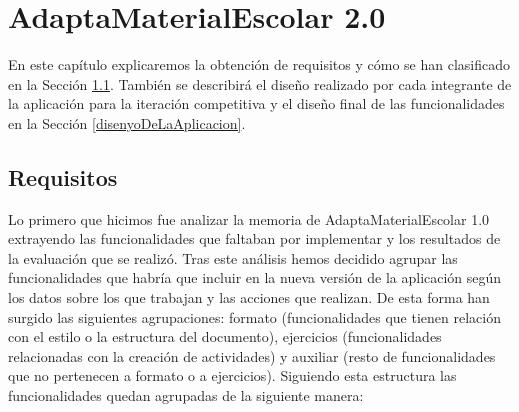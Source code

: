 \chapter{AdaptaMaterialEscolar 2.0}
\label{cap:AdaptaMaterialEscolar2.0}
En este capítulo explicaremos la obtención de requisitos y cómo se han clasificado en la Sección \ref{cap:requisitos}. También se describirá el diseño realizado por cada integrante de la aplicación para la iteración competitiva y el diseño final de las funcionalidades en la Sección \ref{disenyoDeLaAplicacion}.

\section{Requisitos}
\label{cap:requisitos}

Lo primero que hicimos fue analizar la memoria de AdaptaMaterialEscolar 1.0 \citep*{AdaptaMaterialEscolar1.0} extrayendo las funcionalidades que faltaban por implementar y los resultados de la evaluación que se realizó. Tras este análisis hemos decidido agrupar las funcionalidades que habría que incluir en la nueva versión de la aplicación según los datos sobre los que trabajan y las acciones que realizan. De esta forma han surgido las siguientes agrupaciones: formato (funcionalidades que tienen relación con el estilo o la estructura del documento), ejercicios (funcionalidades relacionadas con la creación de actividades) y auxiliar (resto de funcionalidades que no pertenecen a formato o a ejercicios). Siguiendo esta estructura las funcionalidades quedan agrupadas de la siguiente manera:
\\

